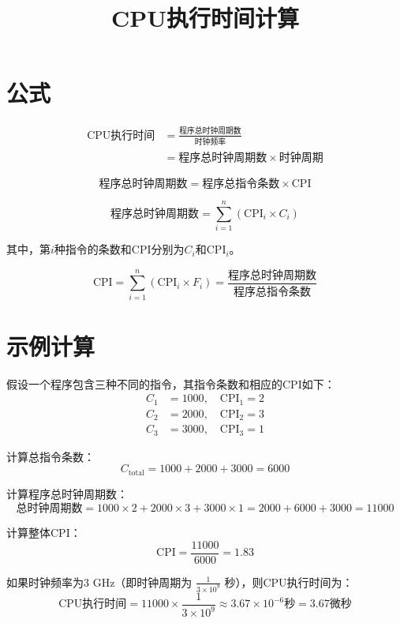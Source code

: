 \documentclass{article}
\begin{document}
\title{CPU执行时间计算}
\author{}
\date{}
\maketitle

\section*{公式}
\begin{align*}
    \text{CPU执行时间} &= \frac{\text{程序总时钟周期数}}{\text{时钟频率}} \\
                        &= \text{程序总时钟周期数} \times \text{时钟周期}
\end{align*}

\begin{equation}
    \text{程序总时钟周期数} = \text{程序总指令条数} \times \text{CPI}
\end{equation}

\begin{equation}
    \text{程序总时钟周期数} = \sum_{i=1}^{n} (\text{CPI}_i \times C_i)
\end{equation}

其中，第$i$种指令的条数和CPI分别为$C_i$和$\text{CPI}_i$。

\begin{equation}
    \text{CPI} = \sum_{i=1}^{n} (\text{CPI}_i \times F_i) = \frac{\text{程序总时钟周期数}}{\text{程序总指令条数}}
\end{equation}

\section*{示例计算}
假设一个程序包含三种不同的指令，其指令条数和相应的CPI如下：
\begin{align*}
    C_1 &= 1000, \quad \text{CPI}_1 = 2 \\
    C_2 &= 2000, \quad \text{CPI}_2 = 3 \\
    C_3 &= 3000, \quad \text{CPI}_3 = 1
\end{align*}

计算总指令条数：
\begin{equation}
    C_{\text{total}} = 1000 + 2000 + 3000 = 6000
\end{equation}

计算程序总时钟周期数：
\begin{equation}
    \text{总时钟周期数} = 1000 \times 2 + 2000 \times 3 + 3000 \times 1 = 2000 + 6000 + 3000 = 11000
\end{equation}

计算整体CPI：
\begin{equation}
    \text{CPI} = \frac{11000}{6000} = 1.83
\end{equation}

如果时钟频率为3 GHz（即时钟周期为 $\frac{1}{3 \times 10^9}$ 秒），则CPU执行时间为：
\begin{equation}
    \text{CPU执行时间} = 11000 \times \frac{1}{3 \times 10^9} \approx 3.67 \times 10^{-6} \text{秒} = 3.67 \text{微秒}
\end{equation}
\end{document}
